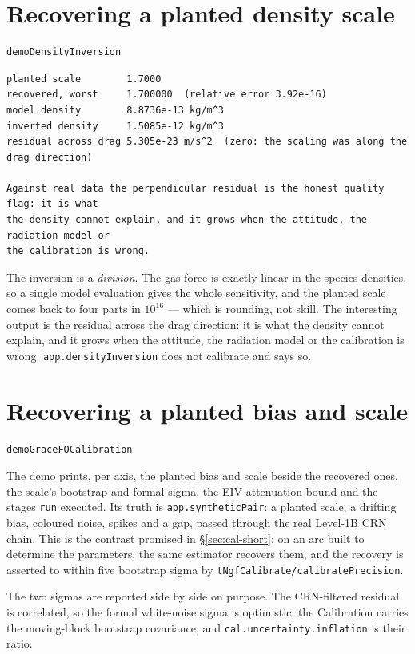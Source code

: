 \documentclass[11pt,a4paper]{report}
\begin{document}
\section{Recovering a planted density scale}
\begin{lstlisting}
demoDensityInversion
\end{lstlisting}
\begin{lstlisting}
planted scale        1.7000
recovered, worst     1.700000  (relative error 3.92e-16)
model density        8.8736e-13 kg/m^3
inverted density     1.5085e-12 kg/m^3
residual across drag 5.305e-23 m/s^2  (zero: the scaling was along the drag direction)

Against real data the perpendicular residual is the honest quality flag: it is what
the density cannot explain, and it grows when the attitude, the radiation model or
the calibration is wrong.
\end{lstlisting}

\noindent The inversion is a \emph{division}. The gas force is exactly linear in the species
densities, so a single model evaluation gives the whole sensitivity, and the planted scale comes
back to four parts in $10^{16}$ --- which is rounding, not skill. The interesting output is the
residual across the drag direction: it is what the density cannot explain, and it grows when the
attitude, the radiation model or the calibration is wrong. \texttt{app.densityInversion} does not
calibrate and says so.

\section{Recovering a planted bias and scale}
\label{sec:ex-cal}
\begin{lstlisting}
demoGraceFOCalibration
\end{lstlisting}
\noindent The demo prints, per axis, the planted bias and scale beside the recovered ones, the
scale's bootstrap and formal sigma, the EIV attenuation bound and the stages \texttt{run} executed.
Its truth is \texttt{app.syntheticPair}: a planted scale, a drifting bias, coloured noise, spikes
and a gap, passed through the real Level-1B CRN chain. This is the contrast promised in
\S\ref{sec:cal-short}: on an arc built to determine the parameters, the same estimator recovers
them, and the recovery is asserted to within five bootstrap sigma by
\texttt{tNgfCalibrate/calibratePrecision}.

The two sigmas are reported side by side on purpose. The CRN-filtered residual is correlated, so
the formal white-noise sigma is optimistic; the Calibration carries the moving-block bootstrap
covariance, and \texttt{cal.uncertainty.inflation} is their ratio.
\end{document}
